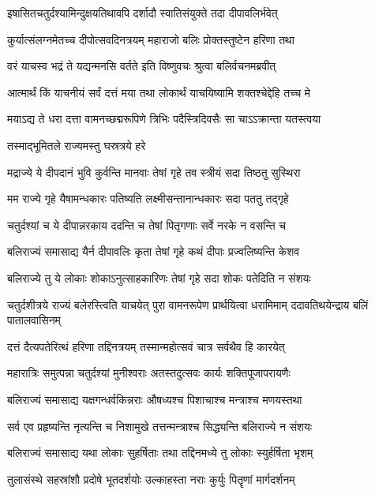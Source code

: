 \twolineshloka
{इषासितचतुर्दश्यामिन्दुक्षयतिथावपि}
{दर्शादौ स्वातिसंयुक्ते तदा दीपावलिर्भवेत्} %

\twolineshloka
{कुर्यात्संलग्नमेतच्च दीपोत्सवदिनत्रयम्}
{महाराजो बलिः प्रोक्तस्तुष्टेन हरिणा तथा} %

\twolineshloka
{वरं याचस्व भद्रं ते यद्यन्मनसि वर्तते}
{इति विष्णुवचः श्रुत्वा बलिर्वचनमब्रवीत्} %

\twolineshloka
{आत्मार्थं किं याचनीयं सर्वं दत्तं मया तथा}
{लोकार्थं याचयिष्यामि शक्तश्चेद्देहि तच्च मे} %

\twolineshloka
{मयाऽद्य ते धरा दत्ता वामनच्छद्मरूपिणे}
{त्रिभिः पदैस्त्रिदिवसैः सा चाऽऽक्रान्ता यतस्त्वया} %


\onelineshloka
{तस्माद्भूमितले राज्यमस्तु घस्रत्रये हरे} %

\twolineshloka
{मद्राज्ये ये दीपदानं भुवि कुर्वन्ति मानवाः}
{तेषां गृहे तव स्त्रीयं सदा तिष्ठतु सुस्थिरा} %

\twolineshloka
{मम राज्ये गृहे यैषामन्धकारः पतिष्यति}
{लक्ष्मीसन्तानान्धकारः सदा पततु तद्गृहे} %

\twolineshloka
{चतुर्दश्यां च ये दीपान्नरकाय ददन्ति च}
{तेषां पितृगणाः सर्वे नरके न वसन्ति च} %

\twolineshloka
{बलिराज्यं समासाद्य यैर्न दीपावलिः कृता}
{तेषां गृहे कथं दीपाः प्रज्वलिष्यन्ति केशव} %

\twolineshloka
{बलिराज्ये तु ये लोकाः शोकाऽनुत्साहकारिणः}
{तेषां गृहे सदा शोकः पतेदिति न संशयः} %

\threelineshloka
{चतुर्दशीत्रये राज्यं बलेरस्त्विति याचयेत्}
{पुरा वामनरूपेण प्रार्थयित्वा धरामिमाम्}
{ददावतिथयेन्द्राय बलिं पातालवासिनम्} %

\twolineshloka
{दत्तं दैत्यपतेरित्थं हरिणा तद्दिनत्रयम्}
{तस्मान्महोत्सवं चात्र सर्वथैव हि कारयेत्} %

\twolineshloka
{महारात्रिः समुत्पन्ना चतुर्दश्यां मुनीश्वराः}
{अतस्तदुत्सवः कार्यः शक्तिपूजापरायणैः} %

\twolineshloka
{बलिराज्यं समासाद्य यक्षगन्धर्वकिन्नराः}
{औषध्यश्च पिशाचाश्च मन्त्राश्च मणयस्तथा} %

\twolineshloka
{सर्व एव प्रहृष्यन्ति नृत्यन्ति च निशामुखे}
{तत्तन्मन्त्राश्च सिद्ध्यन्ति बलिराज्ये न संशयः} %

\twolineshloka
{बलिराज्यं समासाद्य यथा लोकाः सुहर्षिताः}
{तथा तद्दिनमध्ये तु लोकाः स्युर्हर्षिता भृशम्} %

\twolineshloka
{तुलासंस्थे सहस्रांशौ प्रदोषे भूतदर्शयोः}
{उल्काहस्ता नराः कुर्युः पितॄणां मार्गदर्शनम्} %

